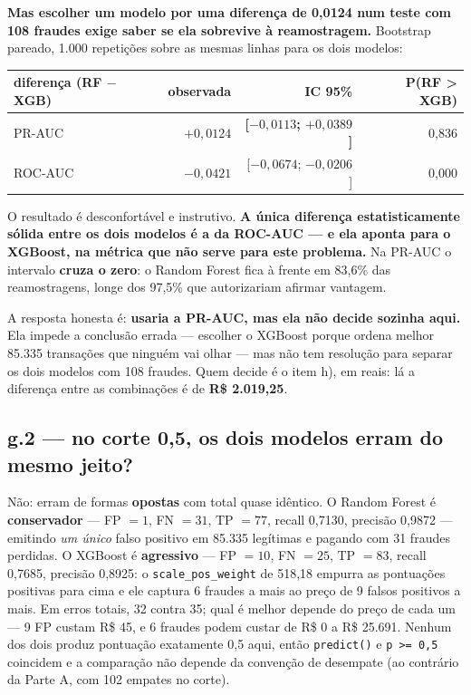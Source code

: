 \documentclass[10pt,a4paper]{article}
\newcommand{\resp}[1]{\subsection{#1}}
\begin{document}
\textbf{Mas escolher um modelo por uma diferença de 0,0124 num teste com 108 fraudes exige
saber se ela sobrevive à reamostragem.} Bootstrap pareado, 1.000 repetições sobre as mesmas
linhas para os dois modelos:

\begin{center}\small
\begin{tabular}{lrrr}
\toprule
diferença (RF $-$ XGB) & observada & IC 95\% & P(RF > XGB)\\
\midrule
PR-AUC & $+0{,}0124$ & \textbf{[$-0{,}0113$; $+0{,}0389$]} & 0,836\\
ROC-AUC & $-0{,}0421$ & [$-0{,}0674$; $-0{,}0206$] & 0,000\\
\bottomrule
\end{tabular}
\end{center}

O resultado é desconfortável e instrutivo. \textbf{A única diferença estatisticamente sólida
entre os dois modelos é a da ROC-AUC --- e ela aponta para o XGBoost, na métrica que não serve
para este problema.} Na PR-AUC o intervalo \textbf{cruza o zero}: o Random Forest fica à frente
em 83,6\% das reamostragens, longe dos 97,5\% que autorizariam afirmar vantagem.

A resposta honesta é: \textbf{usaria a PR-AUC, mas ela não decide sozinha aqui.} Ela impede a
conclusão errada --- escolher o XGBoost porque ordena melhor 85.335 transações que ninguém vai
olhar --- mas não tem resolução para separar os dois modelos com 108 fraudes. Quem decide é o
item h), em reais: lá a diferença entre as combinações é de \textbf{R\$ 2.019,25}.

\resp{g.2 --- no corte 0,5, os dois modelos erram do mesmo jeito?}

Não: erram de formas \textbf{opostas} com total quase idêntico. O Random Forest é
\textbf{conservador} --- FP $=1$, FN $=31$, TP $=77$, recall 0,7130, precisão 0,9872 ---
emitindo \emph{um único} falso positivo em 85.335 legítimas e pagando com 31 fraudes perdidas.
O XGBoost é \textbf{agressivo} --- FP $=10$, FN $=25$, TP $=83$, recall 0,7685, precisão
0,8925: o \texttt{scale\_pos\_weight} de 518,18 empurra as pontuações positivas para cima e ele
captura 6 fraudes a mais ao preço de 9 falsos positivos a mais. Em erros totais, 32 contra 35;
qual é melhor depende do preço de cada um --- 9 FP custam R\$ 45, e 6 fraudes podem custar de
R\$ 0 a R\$ 25.691. Nenhum dos dois produz pontuação exatamente 0,5 aqui, então
\texttt{predict()} e \texttt{p >= 0,5} coincidem e a comparação não depende da convenção de
desempate (ao contrário da Parte A, com 102 empates no corte).
\end{document}
